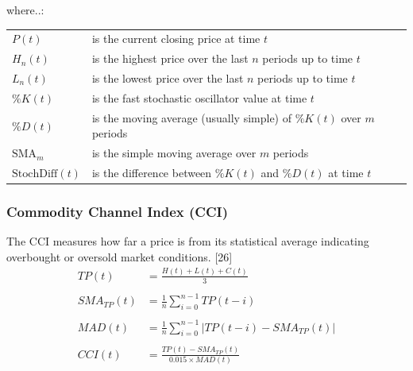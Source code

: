 \documentclass[a4paper,12pt]{report}
\begin{document}
\begin{minipage}{\textwidth}

where..:\\

\begin{tabularx}{\textwidth}{@{}l@{\hspace{2em}--\hspace{2em}}X@{}}
  $P(t)$         & is the current closing price at time $t$ \\
  $H_n(t)$       & is the highest price over the last $n$ periods up to time $t$ \\
  $L_n(t)$       & is the lowest price over the last $n$ periods up to time $t$ \\
  $\%K(t)$       & is the fast stochastic oscillator value at time $t$ \\
  $\%D(t)$       & is the moving average (usually simple) of $\%K(t)$ over $m$ periods \\
  $\text{SMA}_m$ & is the simple moving average over $m$ periods \\
  $\text{StochDiff}(t)$ & is the difference between $\%K(t)$ and $\%D(t)$ at time $t$ \\
\end{tabularx}

\end{minipage}

			\subsubsection{Commodity Channel Index (CCI)}

The CCI measures how far a price is from its statistical average indicating overbought or oversold market conditions. [26]\\

\[
\begin{aligned}
  TP(t) &= \frac{H(t) + L(t) + C(t)}{3} \\\\
  SMA_{TP}(t) &= \frac{1}{n} \sum_{i=0}^{n-1} TP(t-i) \\\\
  MAD(t) &= \frac{1}{n} \sum_{i=0}^{n-1} |TP(t-i) - SMA_{TP}(t)| \\\\
  CCI(t) &= \frac{TP(t) - SMA_{TP}(t)}{0.015 \times MAD(t)} \\\\
\end{aligned}
\]
\end{document}

